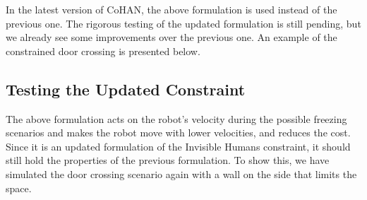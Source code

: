 In the latest version of CoHAN, the above formulation is used instead of the previous one. The rigorous testing of the updated formulation is still pending, but we already see some improvements over the previous one. An example of the constrained door crossing is presented below.

\subsection{Testing the Updated Constraint}
\hspace{\parindent} The above formulation acts on the robot's velocity during the possible freezing scenarios and makes the robot move with lower velocities, and reduces the cost. Since it is an updated formulation of the Invisible Humans constraint, it should still hold the properties of the previous formulation. To show this, we have simulated the door crossing scenario again with a wall on the side that limits the space. 

